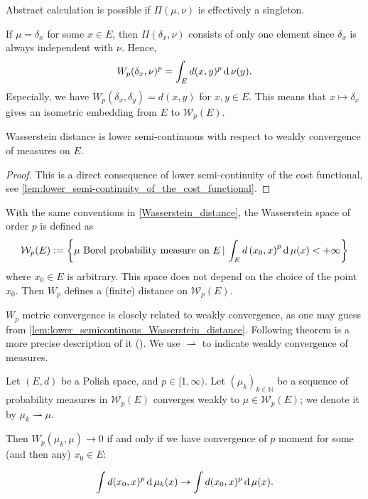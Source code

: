 Abstract calculation is possible if $\Pi(\mu,\nu)$ is effectively a singleton.
\begin{example}
	\label{example:delta_measure_Wasserstein_distance}
	If $\mu=\delta_x$ for some $x \in E$,
	then $\Pi(\delta_x, \nu)$ consists of only one element since $\delta_x$ is always independent with $\nu$.
	Hence,
	\[
		W_p(\delta_x, \nu)^p = \int_{E} d(x, y)^p \operatorname{d} \nu(y).
	\]
	Especially, we have $W_p(\delta_x, \delta_y) = d(x,y)$ for $x,y \in E$.
	This means that $x \mapsto \delta_x$ gives an isometric embedding from $E$ to $\mathcal{W}_p(E)$.
\end{example}

\begin{lem}
	\label{lem:lower_semicontinous_Wasserstein_distance}
	Wasserstein distance is lower semi-continuous with respect to weakly convergence of measures on $E$.
\end{lem}

\begin{proof}
	This is a direct consequence of lower semi-continuity of the cost functional,
	see \cref{lem:lower_semi-continuity_of_the_cost_functional}.
\end{proof}

\begin{defn}
	\label{Wasserstein_space}
	With the same conventions in \cref{Wasserstein_distance}, the Wasserstein space of order \( p \) is defined as
	\[
		\mathcal{W}_p(E): = \left\{ \mu \text{ Borel  probability measure on } E \,|
		\, \int _ { E } d \left( x _ { 0 } , x \right) ^ { p } \operatorname{d} \mu (x) < + \infty \right\}
	\]
	where \( x _ { 0 } \in E \) is arbitrary. This space does not depend on the choice of the point \( x _ { 0 } \). Then \( W _ { p } \) defines a (finite) distance on \( \mathcal{W}_p(E) \).
\end{defn}

$W_p$ metric convergence is closely related to weakly convergence,
as one may guess from \cref{lem:lower_semicontinous_Wasserstein_distance}.
Following theorem is a more precise description of it (\cite[Theorem 6.9]{villani2008optimal}).
We use $\rightharpoonup$ to indicate weakly convergence of measures.

\begin{thm}
	\label{thm:Wp_metricizes_weak_convergence}
	Let \( ( E , d ) \) be a Polish space, and \( p \in [ 1 , \infty ) \).
	Let \( \left( \mu _ { k } \right) _ { k \in \mathbb{ N } } \) be a
	sequence of probability measures in \( \mathcal{W}_p ( E ) \)
	converges weakly to \( \mu \in \mathcal{W}_p(E)	\);
	we denote it by $\mu_k \rightharpoonup \mu$.

	Then \( W_p \left( \mu _ { k }, \mu \right) \rightarrow 0 \)
	if and only if we have convergence of $p$ moment for
	some (and then any) \( x _ { 0 } \in E\):

	\[
		\int d ( x _ { 0 } , x ) ^ { p } \operatorname{d} \mu _ { k } ( x ) \rightarrow \int d ( x _ { 0 } , x ) ^ { p } \operatorname{d} \mu ( x ).
	\]

\end{thm}

